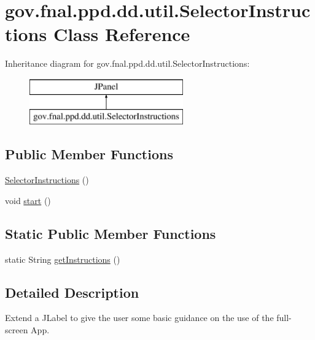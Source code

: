 \hypertarget{classgov_1_1fnal_1_1ppd_1_1dd_1_1util_1_1SelectorInstructions}{\section{gov.\-fnal.\-ppd.\-dd.\-util.\-Selector\-Instructions Class Reference}
\label{classgov_1_1fnal_1_1ppd_1_1dd_1_1util_1_1SelectorInstructions}
}
Inheritance diagram for gov.\-fnal.\-ppd.\-dd.\-util.\-Selector\-Instructions\-:\begin{figure}[H]
\begin{center}
\leavevmode
\includegraphics[height=2.000000cm]{classgov_1_1fnal_1_1ppd_1_1dd_1_1util_1_1SelectorInstructions}
\end{center}
\end{figure}
\subsection*{Public Member Functions}
\begin{DoxyCompactItemize}
\item 
\hyperlink{classgov_1_1fnal_1_1ppd_1_1dd_1_1util_1_1SelectorInstructions_aa7d5e87c6606d7a8d910d94bffd2bf13}{Selector\-Instructions} ()
\item 
void \hyperlink{classgov_1_1fnal_1_1ppd_1_1dd_1_1util_1_1SelectorInstructions_a90e36e8a6819e15ab5bef2a9a5ff835f}{start} ()
\end{DoxyCompactItemize}
\subsection*{Static Public Member Functions}
\begin{DoxyCompactItemize}
\item 
static String \hyperlink{classgov_1_1fnal_1_1ppd_1_1dd_1_1util_1_1SelectorInstructions_ac180ad936016af951d993e518f5a4ac4}{get\-Instructions} ()
\end{DoxyCompactItemize}


\subsection{Detailed Description}
Extend a J\-Label to give the user some basic guidance on the use of the full-\/screen App.

